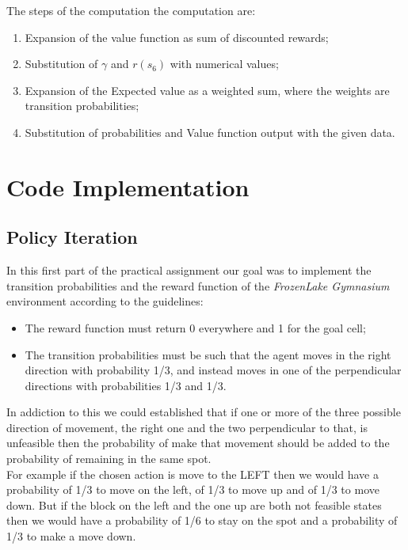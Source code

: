 \documentclass[10pt,a4paper]{article}
\begin{document}
\vspace{10pt}
\noindent The steps of the computation the computation are:
\begin{enumerate}
    \item Expansion of the value function as sum of discounted rewards;
    \item Substitution of $\gamma$ and $r(s_6)$ with numerical values;
    \item Expansion of the Expected value as a weighted sum, where the weights are transition probabilities;
    \item Substitution of probabilities and Value function output with the given data.
\end{enumerate}
\newpage

\section{Code Implementation}
\subsection{Policy Iteration}
In this first part of the practical assignment our goal was to implement the transition probabilities and the reward function of the \textit{FrozenLake Gymnasium} environment according to the guidelines:
\begin{itemize}
    \item The reward function must return 0 everywhere and 1 for the goal cell;
    \item The transition probabilities must be such that the agent moves in the right direction with probability 1/3, and instead moves in one of the perpendicular directions with probabilities 1/3 and 1/3.
\end{itemize} 
In addiction to this we could established that if one or more of the three possible direction of movement, the right one and the two perpendicular to that, is unfeasible then the probability of make that movement should be added to the probability of remaining in the same spot.\\

\noindent For example if the chosen action is move to the LEFT then we would have a probability of 1/3 to move on the left, of 1/3 to move up and of 1/3 to move down. But if the block on the left and the one up are both not feasible states then we would have a probability of 1/6 to stay on the spot and a probability of 1/3 to make a move down.\\
\end{document}
